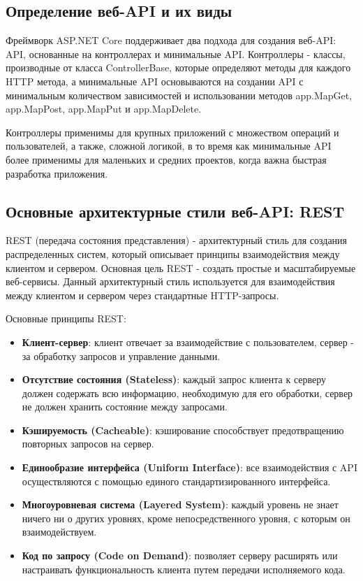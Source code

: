 \documentclass[a4paper,12pt]{report}
\begin{document}
\subsection{Определение веб-\acs{API} и их виды}

Фреймворк ASP.NET Core поддерживает два подхода для создания веб-\acs{API}: \acs{API}, основанные на контроллерах 
и минимальные \acs{API}. Контроллеры - классы, производные от класса ControllerBase, которые определяют методы 
для каждого \acs{HTTP} метода, а минимальные \acs{API} основываются на создании \acs{API} с минимальным количеством 
зависимостей и использовании методов app.MapGet, app.MapPost, app.MapPut и app.MapDelete. 

Контроллеры применимы для крупных приложений с множеством операций и пользователей, а также, сложной логикой, 
в то время как минимальные \acs{API} более применимы для маленьких и средних проектов, когда важна быстрая разработка приложения.

\subsection{Основные архитектурные стили веб-\acs{API}: \acs{REST}}

\ac{REST} (передача состояния представления) - архитектурный стиль для создания распределенных систем, который описывает принципы 
взаимодействия между клиентом и сервером. Основная цель \acs{REST} - создать простые и масштабируемые веб-сервисы. 
Данный архитектурный стиль используется для взаимодействия между клиентом и сервером через стандартные \acs{HTTP}-запросы.

Основные принципы \acs{REST}:
\begin{itemize}
    \item
        \textbf{Клиент-сервер}: клиент отвечает за взаимодействие с пользователем, сервер - за обработку запросов и управление данными.
    \item 
        \textbf{Отсутствие состояния (Stateless)}: каждый запрос клиента к серверу должен содержать всю информацию, необходимую для его обработки, 
        сервер не должен хранить состояние между запросами.
    \item
        \textbf{Кэшируемость (Cacheable)}: кэширование способствует предотвращению повторных запросов на сервер.
    \item
        \textbf{Единообразие интерфейса (Uniform Interface)}: все взаимодействия с API осуществляются с помощью единого стандартизированного интерфейса.
    \item
        \textbf{Многоуровневая система (Layered System)}: каждый уровень не знает ничего ни о других уровнях, кроме непосредственного уровня, с которым он взаимодействуем.
    \item
        \textbf{Код по запросу (Code on Demand)}: позволяет серверу расширять или настраивать функциональность клиента путем передачи исполняемого кода.
\end{itemize}
\end{document}
